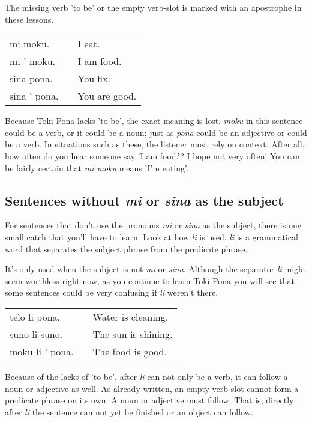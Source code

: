 The missing verb 'to be' or the empty verb-slot is marked with an apostrophe in these lessons. 

\begin{supertabular}{p{5cm}|ll}
mi moku. && I eat.  \\
mi ' moku. && I am food. \\  
sina pona. && You fix. \\
sina ' pona. && You are good. \\  
\end{supertabular} 

Because Toki Pona lacks 'to be', the exact meaning is lost. 
\textit{moku} in this sentence could be a verb, or it could be a noun; just as \textit{pona} could be an adjective or could be a verb. 
In situations such as these, the listener must rely on context. 
After all, how often do you hear someone say 'I am food.'? 
I hope not very often! You can be fairly certain that \textit{mi moku} means 'I'm eating'. 
%
\subsection*{Sentences without \textit{mi} or \textit{sina} as the subject}
%
For sentences that don't use the pronouns \textit{mi} or \textit{sina} as the subject, there is one small catch that you'll have to learn. 
Look at how \textit{li} is used. 
\textit{\textit{li}} is a grammatical word that separates the subject phrase from the predicate phrase. 


It's only used when the subject is not \textit{mi} or \textit{sina}. 
Although the separator \textit{li} might seem worthless right now, as you continue to learn Toki Pona you will see that some sentences could be very confusing if \textit{li} weren't there. 

\begin{supertabular}{p{5cm}|ll}
telo li pona. && Water is cleaning. \\
suno li suno. && The sun is shining. \\
moku li ' pona. && The food is good. \\ 
\end{supertabular} 

Because of the lacks of 'to be', after \textit{li} can not only be a verb, it can follow a noun or adjective as well. 
As already written, an empty verb slot cannot form a predicate phrase on its own. 
A noun or adjective must follow. 
That is, directly after \textit{li} the sentence can not yet be finished or an object can follow.
%
\newpage
